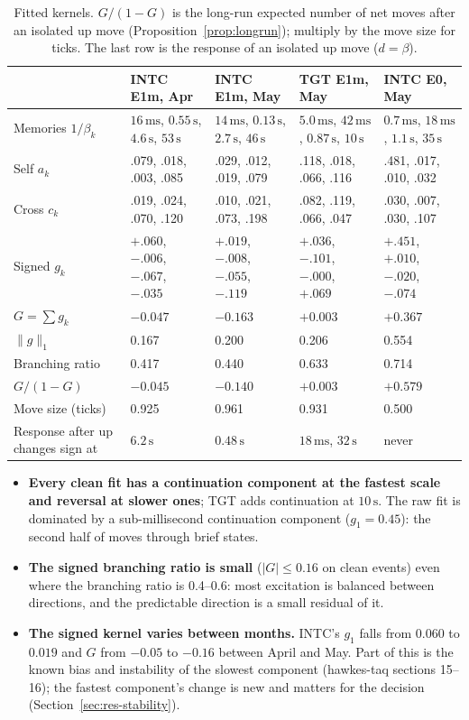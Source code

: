 \documentclass[11pt]{article}
\theoremstyle{definition}
\theoremstyle{remark}
\newcommand{\Eo}{\textsf{E0}}
\newcommand{\Em}{\textsf{E1m}}
\newcommand{\ms}{\,\text{ms}}
\newcommand{\sx}{\,\text{s}}
\begin{document}
\begin{table}[ht]
\centering
\small
\begin{tabularx}{\textwidth}{@{}p{2.9cm}LLLL@{}}
\toprule
& INTC \Em, Apr & INTC \Em, May & TGT \Em, May & INTC \Eo, May \\
\midrule
Memories $1/\beta_k$ & $16\ms$, $0.55\sx$, $4.6\sx$, $53\sx$ & $14\ms$, $0.13\sx$, $2.7\sx$, $46\sx$ & $5.0\ms$, $42\ms$, $0.87\sx$, $10\sx$ & $0.7\ms$, $18\ms$, $1.1\sx$, $35\sx$ \\
Self $a_k$ & .079, .018, .003, .085 & .029, .012, .019, .079 & .118, .018, .066, .116 & .481, .017, .010, .032 \\
Cross $c_k$ & .019, .024, .070, .120 & .010, .021, .073, .198 & .082, .119, .066, .047 & .030, .007, .030, .107 \\
Signed $g_k$ & $+.060$, $-.006$, $-.067$, $-.035$ & $+.019$, $-.008$, $-.055$, $-.119$ & $+.036$, $-.101$, $-.000$, $+.069$ & $+.451$, $+.010$, $-.020$, $-.074$ \\
$G = \sum g_k$ & $-0.047$ & $-0.163$ & $+0.003$ & $+0.367$ \\
$\|g\|_1$ & 0.167 & 0.200 & 0.206 & 0.554 \\
Branching ratio & 0.417 & 0.440 & 0.633 & 0.714 \\
$G/(1-G)$ & $-0.045$ & $-0.140$ & $+0.003$ & $+0.579$ \\
Move size (ticks) & 0.925 & 0.961 & 0.931 & 0.500 \\
Response after up changes sign at & $6.2\sx$ & $0.48\sx$ & $18\ms$, $32\sx$ & never \\
\bottomrule
\end{tabularx}
\caption{Fitted kernels. $G/(1-G)$ is the long-run expected number of net moves after an isolated up move (Proposition~\ref{prop:longrun}); multiply by the move size for ticks. The last row is the response of an isolated up move ($d = \beta$).}
\label{tab:kernels}
\end{table}

\begin{itemize}
\item \textbf{Every clean fit has a continuation component at the fastest scale and reversal at slower ones}; TGT adds continuation at $10\sx$. The raw fit is dominated by a sub-millisecond continuation component ($g_1 = 0.45$): the second half of moves through brief states.
\item \textbf{The signed branching ratio is small} ($|G| \le 0.16$ on clean events) even where the branching ratio is 0.4--0.6: most excitation is balanced between directions, and the predictable direction is a small residual of it.
\item \textbf{The signed kernel varies between months.} INTC's $g_1$ falls from $0.060$ to $0.019$ and $G$ from $-0.05$ to $-0.16$ between April and May. Part of this is the known bias and instability of the slowest component (hawkes-taq sections 15--16); the fastest component's change is new and matters for the decision (Section~\ref{sec:res-stability}).
\end{itemize}
\end{document}
